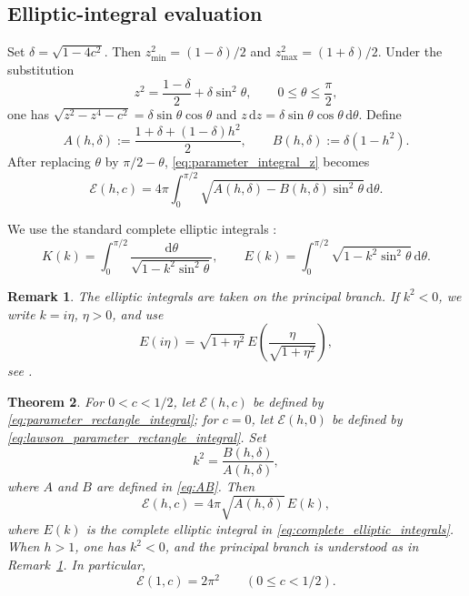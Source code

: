 \documentclass[a4paper,11pt]{amsart}
\numberwithin{equation}{section}
\theoremstyle{plain}
\newtheorem{thm}{Theorem}[section]
\newtheorem{rem}[thm]{Remark}
\newcommand{\dif}{\mathrm{d}}
\begin{document}
\subsection{Elliptic-integral evaluation}

Set $\delta=\sqrt{1-4c^2}$. Then
$z_{\min}^2=(1-\delta)/2$ and $z_{\max}^2=(1+\delta)/2$. Under the
substitution
\[
z^2=\frac{1-\delta}{2}+\delta\sin^2\theta,
\qquad 0\leq\theta\leq\frac{\pi}{2},
\]
one has
$\sqrt{z^2-z^4-c^2}=\delta\sin\theta\cos\theta$ and
$z\,\dif z=\delta\sin\theta\cos\theta\,\dif\theta$. Define
\begin{equation}\label{eq:AB}
A(h,\delta)
:=
\frac{1+\delta+(1-\delta)h^2}{2},
\qquad
B(h,\delta):=\delta(1-h^2).
\end{equation}
After replacing $\theta$ by $\pi/2-\theta$,
\eqref{eq:parameter_integral_z} becomes
\begin{equation}\label{eq:parameter_integral_theta}
\mathcal E(h,c)
=
4\pi\int_0^{\pi/2}
\sqrt{A(h,\delta)-B(h,\delta)\sin^2\theta}\,\dif\theta.
\end{equation}

We use the standard complete elliptic integrals \cite[Section~19.2]{DLMF}:
\begin{equation}\label{eq:complete_elliptic_integrals}
K(k)=\int_0^{\pi/2}\frac{\dif\theta}{\sqrt{1-k^2\sin^2\theta}},
\qquad
E(k)=\int_0^{\pi/2}\sqrt{1-k^2\sin^2\theta}\,\dif\theta.
\end{equation}

\begin{rem}\label{rem:imaginary_modulus_branch}
The elliptic integrals are taken on the principal branch. If $k^2<0$, we
write $k=i\eta$, $\eta>0$, and use
\[
E(i\eta)
=
\sqrt{1+\eta^2}\,
E\!\left(\frac{\eta}{\sqrt{1+\eta^2}}\right),
\]
see \cite[Eq.~(19.7.2)]{DLMF}.
\end{rem}

\begin{thm}\label{thm:parameter_rectangle_integral}
For $0<c<1/2$, let $\mathcal E(h,c)$ be defined by
\eqref{eq:parameter_rectangle_integral}; for $c=0$, let
$\mathcal E(h,0)$ be defined by
\eqref{eq:lawson_parameter_rectangle_integral}. Set
\[
k^2=\frac{B(h,\delta)}{A(h,\delta)},
\]
where $A$ and $B$ are defined in \eqref{eq:AB}. Then
\begin{equation}\label{eq:parameter_integral_elliptic}
\mathcal E(h,c)
=
4\pi\sqrt{A(h,\delta)}\,E(k),
\end{equation}
where $E(k)$ is the complete elliptic integral in \eqref{eq:complete_elliptic_integrals}.
When $h>1$, one has $k^2<0$, and the principal branch is understood as in
Remark~\ref{rem:imaginary_modulus_branch}. In particular,
\begin{equation}\label{eq:clifford_parameter_integral}
\mathcal E(1,c)=2\pi^2
\qquad (0\leq c<1/2).
\end{equation}
\end{thm}
\end{document}
